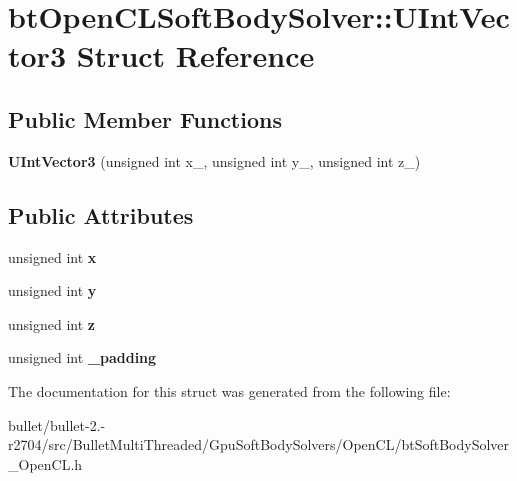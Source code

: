 \hypertarget{structbt_open_c_l_soft_body_solver_1_1_u_int_vector3}{\section{bt\+Open\+C\+L\+Soft\+Body\+Solver\+:\+:U\+Int\+Vector3 Struct Reference}
\label{structbt_open_c_l_soft_body_solver_1_1_u_int_vector3}
}
\subsection*{Public Member Functions}
\begin{DoxyCompactItemize}
\item 
\hypertarget{structbt_open_c_l_soft_body_solver_1_1_u_int_vector3_a2008c03a63b7746bba70a12417077604}{{\bfseries U\+Int\+Vector3} (unsigned int x\+\_\+, unsigned int y\+\_\+, unsigned int z\+\_\+)}\label{structbt_open_c_l_soft_body_solver_1_1_u_int_vector3_a2008c03a63b7746bba70a12417077604}

\end{DoxyCompactItemize}
\subsection*{Public Attributes}
\begin{DoxyCompactItemize}
\item 
\hypertarget{structbt_open_c_l_soft_body_solver_1_1_u_int_vector3_aca2e64702a55e0f6f251293a2e4de1ee}{unsigned int {\bfseries x}}\label{structbt_open_c_l_soft_body_solver_1_1_u_int_vector3_aca2e64702a55e0f6f251293a2e4de1ee}

\item 
\hypertarget{structbt_open_c_l_soft_body_solver_1_1_u_int_vector3_a3416fbf8db1e56e6ec0598d97b106991}{unsigned int {\bfseries y}}\label{structbt_open_c_l_soft_body_solver_1_1_u_int_vector3_a3416fbf8db1e56e6ec0598d97b106991}

\item 
\hypertarget{structbt_open_c_l_soft_body_solver_1_1_u_int_vector3_a832e9c3c268d64c6ba248011d7508bec}{unsigned int {\bfseries z}}\label{structbt_open_c_l_soft_body_solver_1_1_u_int_vector3_a832e9c3c268d64c6ba248011d7508bec}

\item 
\hypertarget{structbt_open_c_l_soft_body_solver_1_1_u_int_vector3_a20943a6bb3fcc12d0dc89551389db7c3}{unsigned int {\bfseries \+\_\+padding}}\label{structbt_open_c_l_soft_body_solver_1_1_u_int_vector3_a20943a6bb3fcc12d0dc89551389db7c3}

\end{DoxyCompactItemize}


The documentation for this struct was generated from the following file\+:\begin{DoxyCompactItemize}
\item 
bullet/bullet-\/2.-\/r2704/src/\+Bullet\+Multi\+Threaded/\+Gpu\+Soft\+Body\+Solvers/\+Open\+C\+L/bt\+Soft\+Body\+Solver\+\_\+\+Open\+C\+L.\+h\end{DoxyCompactItemize}
